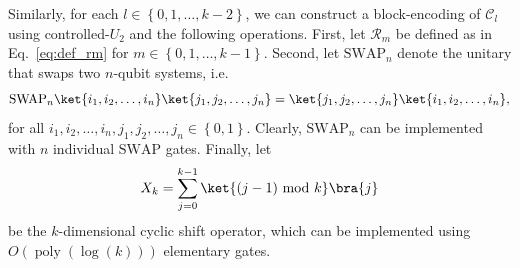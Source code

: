 \documentclass[superscriptaddress,onecolumn,nofootinbib,longbibliography,a4paper,accepted=2026-09-29]{quantumarticle}
\theoremstyle{plain}
\theoremstyle{definition}
\numberwithin{thm}{section}
\numberwithin{assumption}{section}
\numberwithin{lemma}{section}
\numberwithin{prop}{section}
\numberwithin{cor}{section}
\numberwithin{definition}{section}
\numberwithin{rmk}{section}
\numberwithin{equation}{section}
\newcommand{\lrb}[1]{\left ( #1 \right )}
\newcommand{\lrcb}[1]{\left \{ #1 \right \}}
\newcommand{\mypoly}[1]{\operatorname{poly} \lrb{#1}}
\newcommand{\mylog}[1]{\operatorname{log} \lrb{#1}}
\newcommand{\myO}[1]{O\lrb{#1}}
\begin{document}
Similarly, for each $l \in \lrcb{0,1,\dots,k-2}$, we can construct a block-encoding of $\mathcal{C}_l$ using controlled-$U_2$ and the following operations. First, let $\mathcal{R}_m$ be defined as in Eq.~\eqref{eq:def_rm} for $m \in \lrcb{0,1,\dots,k-1}$. Second, let $\mathrm{SWAP}_n$ denote the unitary that swaps two $n$-qubit systems, i.e.
\begin{align}
\mathrm{SWAP}_n \ket{i_1,i_2,\dots,i_n}\ket{j_1,j_2,\dots,j_n} = \ket{j_1,j_2,\dots,j_n}\ket{i_1,i_2,\dots,i_n},
\end{align}
for all $i_1,i_2,\dots,i_n, j_1,j_2,\dots,j_n\in \lrcb{0,1}$. Clearly, $\mathrm{SWAP}_n$ can be implemented with $n$ individual $\mathrm{SWAP}$ gates. Finally, let 
\begin{align}
X_k=\sum_{j=0}^{k-1} \ket{(j-1)~\mathrm{mod}~k}\bra{j}    
\end{align}
be the $k$-dimensional cyclic shift operator, which can be implemented using $\myO{\mypoly{\mylog{k}}}$ elementary gates.
\end{document}

